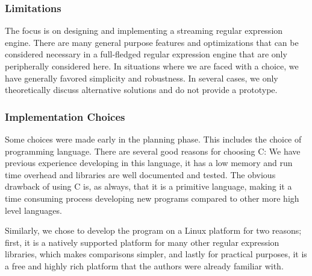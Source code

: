 \subsubsection{Limitations}

The focus is on designing and implementing a streaming regular
expression engine. There are many general purpose features and
optimizations that can be considered necessary in a full-fledged
regular expression engine that are only peripherally considered
here. In situations where we are faced with a choice, we have
generally favored simplicity and robustness.  In several cases, we
only theoretically discuss alternative solutions and do not provide a
prototype.%

\subsubsection{Implementation Choices}

Some choices were made early in the planning phase. This includes the
choice of programming language. There are several good reasons for
choosing C: We have previous experience developing in this language,
it has a low memory and run time overhead and libraries are well
documented and tested. The obvious drawback of using C is, as always,
that it is a primitive language, making it a time consuming process
developing new programs compared to other more high level languages.

Similarly, we chose to develop the program on a Linux platform for two
reasons; first, it is a natively supported platform for many other regular
expression libraries, which makes comparisons simpler, and lastly for
practical purposes, it is a free and highly rich platform that the
authors were already familiar with.



